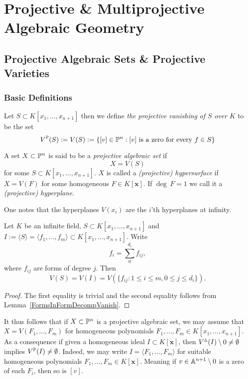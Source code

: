\section{Projective \& Multiprojective Algebraic Geometry}
\subsection{Projective Algebraic Sets \& Projective Varieties}
\subsubsection{Basic Definitions}
    \begin{definition}
        Let $S\subset K[x_1,\dots,x_{n+1}]$ then we define \textit{the projective vanishing of $S$ over $K$} to be the set 
        $$V^{\mathbb{P}}(S) := V(S):= \{ [v]\in \mathbb{P}^n : [v] \text{ is a zero for every } f\in S\}$$
    \end{definition}
    \begin{definition}
        A set $X\subset \mathbb{P}^n$ is said to be a \textit{projective algebraic set} if 
        $$X =V(S)$$
        for some $S\subset K[x_1,\dots,x_{n+1}]$. $X$ is called a \textit{(projective) hypersurface} if $X=V(F)$ for some homogeneous $F\in K[\mathbf{x}]$. If $\deg \ F = 1$ we call it a \textit{(projective) hyperplane}.   
    \end{definition}
    \begin{remark}
        One notes that the hyperplanes $V(x_i)$ are the $i$'th hyperplanes at infinity.
    \end{remark}
    \begin{proposition}
        Let $K$ be an infinite field, $S\subset K[x_1,\dots,x_{n+1}]$ and $I:=\langle S\rangle =\langle f_1,\dots,f_m\rangle \subset K[x_1,\dots,x_{n+1}]$. Write 
        $$f_i=\sum_{0}^{d_i} f_{ij},$$
        where $f_{ij}$ are forms of degree $j$. Then $$V(S)=V(I)= V(\{f_{ij} : 1\leq i\leq m, 0\leq j\leq d_i\}).$$
    \end{proposition}
    \begin{proof}
        The first equality is trivial and the second equality follows from Lemma~\ref{FormsInFormDecompVanish}.
    \end{proof}
    \begin{remark}\label{WeMayAssumeProjectiveAlgebraicSetsToBeVanishingSetsOverHomogeneousIdeals}
        It thus follows that if $X\subset \mathbb{P}^n$ is a projective algebraic set, we may assume that $X=V(F_1,\dots,F_m)$ for homogeneous polynomials $F_1,\dots,F_m\in K[x_1,\dots,x_{n+1}]$. As a consequence if given a homogeneous ideal $I\subset K[\mathbf{x}]$, then $V^{\mathbb{A}}(I)\setminus 0\neq \emptyset$ implies $V^{\mathbb{P}}(I)\neq \emptyset$. Indeed, we may write $I=\langle F_1,\dots,F_m\rangle$ for suitable homogeneous polynomials $F_1,\dots,F_m\in K[\mathbf{x}]$. Meaning if $v\in \mathbb{A}^{n+1}\setminus 0$ is a zero of each $F_i$, then so is $[v]$.      
    \end{remark}
